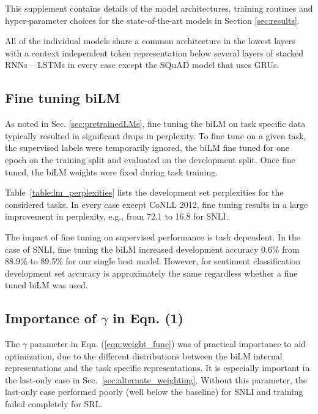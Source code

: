 \documentclass[11pt,a4paper]{article}
\begin{document}
This supplement contains details of the model architectures, training routines and hyper-parameter choices for the state-of-the-art models in Section \ref{sec:results}.

All of the individual models share a common architecture in the lowest layers with a context independent token representation below several layers of stacked RNNs
-- LSTMs in every case except the SQuAD model that uses GRUs.

\subsection{Fine tuning biLM}
As noted in Sec. \ref{sec:pretrainedLMs}, fine tuning the biLM on task specific data typically resulted in significant drops in perplexity.
To fine tune on a given task, the supervised labels were temporarily ignored, the biLM fine tuned for one epoch
on the training split and evaluated on the development split.
Once fine tuned, the biLM weights were fixed during task training.

Table~\ref{table:lm_perplexities} lists the development set perplexities for the considered tasks.   In every case except CoNLL 2012, fine tuning results in a large improvement in perplexity, e.g., from 72.1 to 16.8 for SNLI.

The impact of fine tuning on supervised performance is task dependent.
In the case of SNLI, fine tuning the biLM increased development accuracy 0.6\% from 88.9\% to 89.5\% for our single best model.
However, for sentiment classification development set accuracy is approximately the same regardless whether a fine tuned biLM was used.

\subsection{Importance of $\gamma$ in Eqn. (1)}
The $\gamma$ parameter in Eqn. (\ref{eqn:weight_func}) was of practical importance to aid optimization, due to the different distributions between the biLM internal representations and the task specific representations.
It is especially important in the last-only case in Sec.~\ref{sec:alternate_weighting}.  
Without this parameter, the last-only case performed poorly (well below the baseline) for SNLI and training failed completely for SRL.
\end{document}
